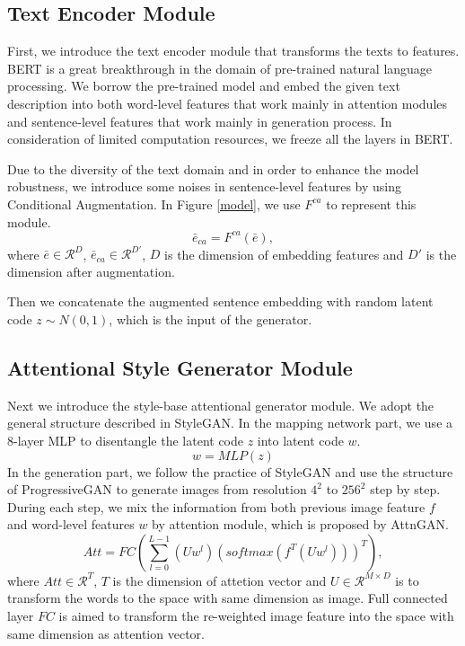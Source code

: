 \documentclass{article}
\begin{document}
\subsection{Text Encoder Module}
First, we introduce the text encoder module that transforms the texts to features. BERT\cite{bert} is a great breakthrough in the domain of pre-trained natural language processing. We borrow the pre-trained model and embed the given text description into both word-level features that work mainly in attention modules and sentence-level features that work mainly in generation process. In consideration of limited computation resources, we freeze all the layers in BERT.

Due to the diversity of the text domain and in order to enhance the model robustness, we introduce some noises in sentence-level features by using Conditional Augmentation\cite{stackgan}. In Figure \ref{model}, we use $F^{ca}$ to represent this module.
\begin{equation}
    \bar{e}_{ca} = F^{ca}(\bar{e}),
\end{equation}
where $\bar{e} \in \mathcal{R}^{D}$, $\bar{e}_{ca} \in \mathcal{R}^{D'}$, $D$ is the dimension of embedding features and $D'$ is the dimension after augmentation.

Then we concatenate the augmented sentence embedding with random latent code $z \sim N(0,1)$, which is the input of the generator.

\subsection{Attentional Style Generator Module}
Next we introduce the style-base attentional generator module. We adopt the general structure described in StyleGAN\cite{stylegan}. In the mapping network part, we use a 8-layer MLP to disentangle the latent code $z$ into latent code $w$.
\begin{equation}
    w = MLP(z)
\end{equation}
In the generation part, we follow the practice of StyleGAN and use the structure of ProgressiveGAN\cite{progan} to generate images from resolution $4^2$ to $256^2$ step by step. During each step, we mix the information from both previous image feature $f$ and word-level features $w$ by attention module, which is proposed by AttnGAN\cite{attngan}.
\begin{equation}
    Att = FC(\sum_{l=0}^{L-1} (Uw^l)(softmax(f^T (Uw^l)))^T),
\end{equation}
where $Att \in \mathcal{R}^{T}$, $T$ is the dimension of attetion vector and $U \in \mathcal{R}^{M \times D}$ is to transform the words to the space with same dimension as image. Full connected layer $FC$ is aimed to transform the re-weighted image feature into the space with same dimension as attention vector.
\end{document}
